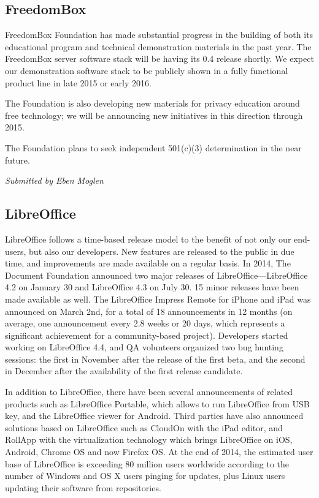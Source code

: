 \documentclass[letterpaper]{report}
\begin{document}
\subsection{FreedomBox}

FreedomBox Foundation has made substantial progress in the building of both
its educational program and technical demonstration materials in the past
year.  The FreedomBox server software stack will be having its 0.4 release
shortly.  We expect our demonstration software stack to be publicly shown
in a fully functional product line in late 2015 or early 2016.

The Foundation is also developing new materials for privacy education
around free technology; we will be announcing new initiatives in this
direction through 2015.

The Foundation plans to seek independent 501(c)(3) determination in the
near future.

{\em Submitted by Eben Moglen}

\subsection{LibreOffice}

LibreOffice follows a time-based release model to the benefit of not only
our end-users, but also our developers. New features are released to the
public in due time, and improvements are made available on a regular basis.
In 2014, The Document Foundation announced two major releases of
LibreOffice---LibreOffice 4.2 on January 30 and LibreOffice 4.3 on July 30.
15 minor releases have been made available as well. The LibreOffice Impress
Remote for iPhone and iPad was announced on March 2nd, for a total of 18
announcements in 12 months (on average, one announcement every 2.8 weeks or
20 days, which represents a significant achievement for a community-based
project). Developers started working on LibreOffice 4.4, and QA volunteers
organized two bug hunting sessions: the first in November after the release
of the first beta, and the second in December after the availability of the
first release candidate.

In addition to LibreOffice, there have been several announcements of
related products such as LibreOffice Portable, which allows to run
LibreOffice from USB key, and the LibreOffice viewer for Android. Third
parties have also announced solutions based on LibreOffice such as CloudOn
with the iPad editor, and RollApp with the virtualization technology which
brings LibreOffice on iOS, Android, Chrome OS and now Firefox OS. At the
end of 2014, the estimated user base of LibreOffice is exceeding 80 million
users worldwide according to the number of Windows and OS X users pinging
for updates, plus Linux users updating their software from repositories.
\end{document}
